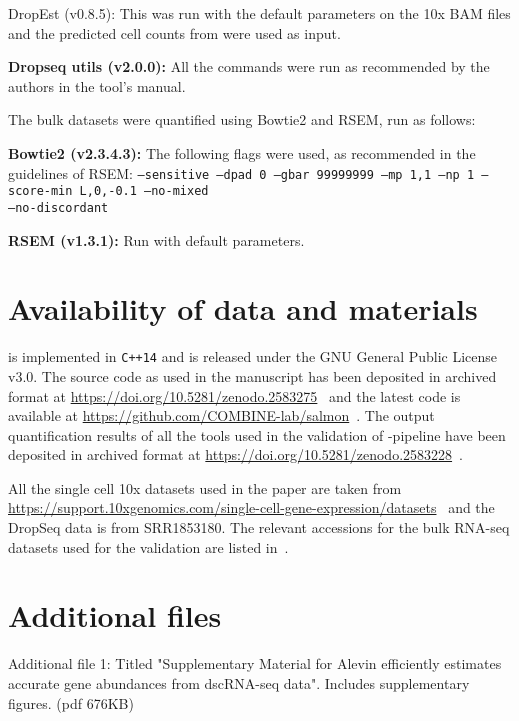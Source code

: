 DropEst (v0.8.5): This was run with the default parameters on the 10x BAM files and the predicted cell counts from \cellr were used as input.

\textbf{Dropseq utils (v2.0.0):} All the commands were run as recommended by the authors in the tool's manual.

The bulk datasets were quantified using Bowtie2 and RSEM, run as follows:

\textbf{Bowtie2 (v2.3.4.3):} The following flags were used, as recommended in the guidelines of RSEM: \texttt{--sensitive --dpad 0 --gbar 99999999 --mp 1,1 --np 1 --score-min L,0,-0.1 --no-mixed \\ --no-discordant}

\textbf{RSEM (v1.3.1):} Run with default parameters.



\section{Availability of data and materials}
\Alevin is implemented in \texttt{C++14} and is released under the GNU General Public License v3.0. The source code as used in the manuscript has been deposited in archived format at \url{https://doi.org/10.5281/zenodo.2583275}~\citep{scode} and the latest code is available at \url{https://github.com/COMBINE-lab/salmon}~\citep{alvgit}. The output quantification results of all the tools used in the validation of \alevin-pipeline have been deposited in archived format at \url{https://doi.org/10.5281/zenodo.2583228}~\citep{vdata}.

All the single cell 10x datasets used in the paper are taken from \url{https://support.10xgenomics.com/single-cell-gene-expression/datasets}~\citep{v2data} and the DropSeq data is from SRR1853180. The relevant accessions for the bulk RNA-seq datasets used for the validation are listed in~.

\section{Additional files}
Additional file 1: Titled "Supplementary Material for Alevin efficiently estimates accurate gene abundances from dscRNA-seq data". Includes supplementary figures. (pdf 676KB)

